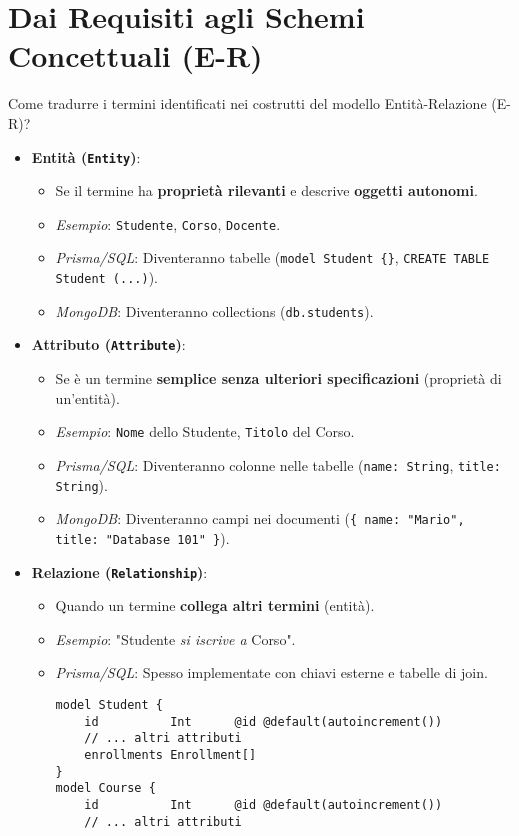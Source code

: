 \section{Dai Requisiti agli Schemi Concettuali (E-R)}
Come tradurre i termini identificati nei costrutti del modello Entità-Relazione (E-R)?
\begin{itemize}
	\item \textbf{Entità (\texttt{Entity})}:
	\begin{itemize}
		\item Se il termine ha \textbf{proprietà rilevanti} e descrive \textbf{oggetti autonomi}.
		\item \textit{Esempio}: \texttt{Studente}, \texttt{Corso}, \texttt{Docente}.
		\item \textit{Prisma/SQL}: Diventeranno tabelle (\texttt{model Student \{\}}, \texttt{CREATE TABLE Student (...)}).
		\item \textit{MongoDB}: Diventeranno collections (\texttt{db.students}).
	\end{itemize}
	\item \textbf{Attributo (\texttt{Attribute})}:
	\begin{itemize}
		\item Se è un termine \textbf{semplice senza ulteriori specificazioni} (proprietà di un'entità).
		\item \textit{Esempio}: \texttt{Nome} dello Studente, \texttt{Titolo} del Corso.
		\item \textit{Prisma/SQL}: Diventeranno colonne nelle tabelle (\texttt{name: String}, \texttt{title: String}).
		\item \textit{MongoDB}: Diventeranno campi nei documenti (\texttt{\{ name: "Mario", title: "Database 101" \}}).
	\end{itemize}
	\item \textbf{Relazione (\texttt{Relationship})}:
	\begin{itemize}
		\item Quando un termine \textbf{collega altri termini} (entità).
		\item \textit{Esempio}: "Studente \textit{si iscrive a} Corso".
		\item \textit{Prisma/SQL}: Spesso implementate con chiavi esterne e tabelle di join.
		\begin{verbatim}
model Student {
	id          Int      @id @default(autoincrement())
	// ... altri attributi
	enrollments Enrollment[]
}
model Course {
	id          Int      @id @default(autoincrement())
	// ... altri attributi

\end{verbatim}
\end{itemize}
\end{itemize}
